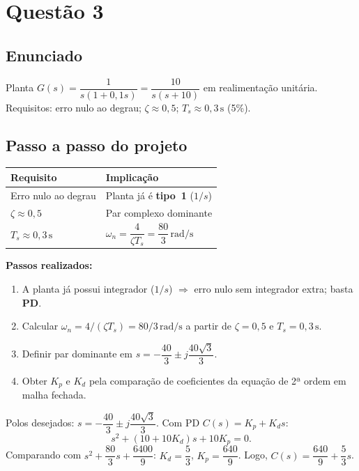 \documentclass[11pt,a4paper]{article}
\begin{document}
\section*{Questão 3}

\subsection*{Enunciado}

Planta $G(s)=\dfrac{1}{s(1+0{,}1s)}=\dfrac{10}{s(s+10)}$ em realimentação
unitária. Requisitos: erro nulo ao degrau; $\zeta\approx 0{,}5$;
$T_s\approx 0{,}3\,\mathrm{s}$ (5\%).

\subsection*{Passo a passo do projeto}

\begin{center}
\begin{tabular}{@{}ll@{}}
  \toprule
  Requisito & Implicação \\
  \midrule
  Erro nulo ao degrau & Planta já é \textbf{tipo~1} ($1/s$) \\
  $\zeta\approx 0{,}5$ & Par complexo dominante \\
  $T_s\approx 0{,}3\,\mathrm{s}$ & $\omega_n=\dfrac{4}{\zeta T_s}=\dfrac{80}{3}\,\mathrm{rad/s}$ \\
  \bottomrule
\end{tabular}
\end{center}

\textbf{Passos realizados:}
\begin{enumerate}[leftmargin=*]
  \item A planta já possui integrador ($1/s$) $\Rightarrow$ erro nulo sem
        integrador extra; basta \textbf{PD}.
  \item Calcular $\omega_n=4/(\zeta T_s)=80/3\,\mathrm{rad/s}$ a partir de
        $\zeta=0{,}5$ e $T_s=0{,}3\,\mathrm{s}$.
  \item Definir par dominante em
        $s=-\dfrac{40}{3}\pm j\dfrac{40\sqrt{3}}{3}$.
  \item Obter $K_p$ e $K_d$ pela comparação de coeficientes da equação de
        2ª ordem em malha fechada.
\end{enumerate}

Polos desejados: $s=-\dfrac{40}{3}\pm j\dfrac{40\sqrt{3}}{3}$. Com PD
$C(s)=K_p+K_d s$:
\[
  s^2+(10+10K_d)s+10K_p=0.
\]
Comparando com $s^2+\dfrac{80}{3}s+\dfrac{6400}{9}$:
$K_d=\dfrac{5}{3}$, $K_p=\dfrac{640}{9}$. Logo,
$C(s)=\dfrac{640}{9}+\dfrac{5}{3}s$.
\end{document}
